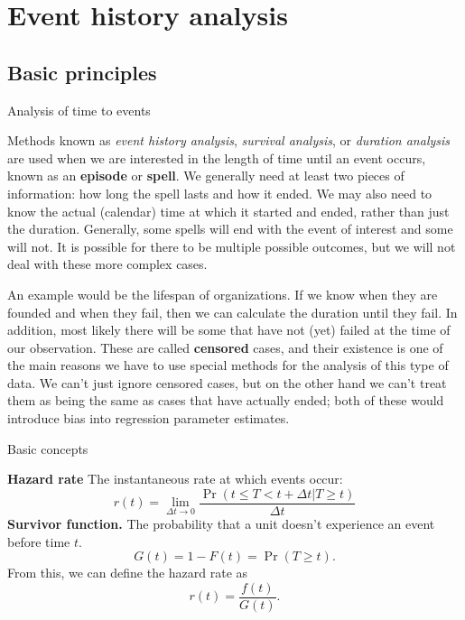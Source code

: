 \documentclass[10pt,ignorenonframetext,]{beamer}
\begin{document}
\section{Event history analysis}\label{event-history-analysis}

\subsection{Basic principles}\label{basic-principles}

\begin{frame}{Analysis of time to events}

Methods known as \emph{event history analysis}, \emph{survival
analysis}, or \emph{duration analysis} are used when we are interested
in the length of time until an event occurs, known as an
\textbf{episode} or \textbf{spell}. We generally need at least two
pieces of information: how long the spell lasts and how it ended. We may
also need to know the actual (calendar) time at which it started and
ended, rather than just the duration. Generally, some spells will end
with the event of interest and some will not. It is possible for there
to be multiple possible outcomes, but we will not deal with these more
complex cases.

An example would be the lifespan of organizations. If we know when they
are founded and when they fail, then we can calculate the duration until
they fail. In addition, most likely there will be some that have not
(yet) failed at the time of our observation. These are called
\textbf{censored} cases, and their existence is one of the main reasons
we have to use special methods for the analysis of this type of data. We
can't just ignore censored cases, but on the other hand we can't treat
them as being the same as cases that have actually ended; both of these
would introduce bias into regression parameter estimates.

\end{frame}

\begin{frame}{Basic concepts}

\textbf{Hazard rate} The instantaneous rate at which events occur: \[
r(t) = \lim_{\Delta t\rightarrow 0}\frac{\Pr(t \le T < t + \Delta t | T \ge t)}
{\Delta t}
\] \textbf{Survivor function.} The probability that a unit doesn't
experience an event before time \(t\). \[
G(t) = 1 - F(t) = \Pr(T \ge t).
\] From this, we can define the hazard rate as \[
r(t) = \frac{f(t)}{G(t)}.
\]

\end{frame}
\end{document}
